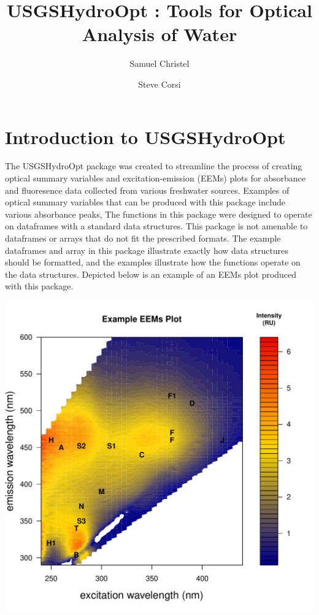 \documentclass[a4paper,11pt]{article}\usepackage[]{graphicx}\usepackage[]{color}
\makeatletter
\def\maxwidth{ %
  \ifdim\Gin@nat@width>\linewidth
    \linewidth
  \else
    \Gin@nat@width
  \fi
}
\newenvironment{knitrout}{}{} %
\makeatother
\begin{document}
\title{USGSHydroOpt : Tools for Optical Analysis of Water}
\author[1]{Samuel Christel}
\author[1]{Steve Corsi}




\maketitle
\tableofcontents

\section{Introduction to USGSHydroOpt}
The USGSHydroOpt package was created to streamline the process of creating optical summary variables and excitation-emission (EEMs) plots for absorbance and fluoresence data collected from various freshwater sources. Examples of optical summary variables that can be produced with this package include various absorbance peaks, The functions in this package were designed to operate on dataframes with a standard data structures. This package is not amenable to dataframes or arrays that do not fit the prescribed formats. The example dataframes and array in this package illustrate exactly how data structures should be formatted, and the examples illustrate how the functions operate on the data structures. Depicted below is an example of an EEMs plot produced with this package.

\begin{knitrout}
\color{fgcolor}
\includegraphics[width=\maxwidth]{figure/unnamed-chunk-3} 

\end{knitrout}
\end{document}
